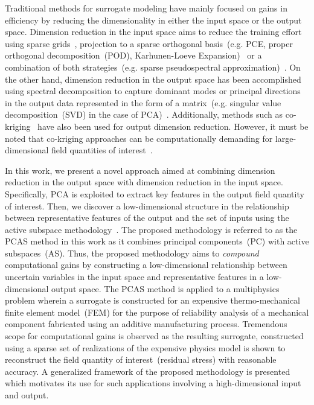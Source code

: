 Traditional methods for surrogate modeling have mainly focused on gains in efficiency by reducing the
dimensionality in either the input space or the output space. Dimension reduction in the input space
aims to reduce the training effort using sparse grids~\cite{Petvipusit:2014,Elsheikh:2014,Zhang:2013,Ma:2009},
projection to a sparse orthogonal basis~(e.g. PCE, proper orthogonal decomposition~(POD),
Karhunen-Loeve Expansion)~\cite{Wang:2005,Galbally:2010,Marzouk:2009} or a combination of both 
strategies~(e.g. sparse pseudospectral approximation)~\cite{Constantine:2012,Winokur:2013,Conrad:2013,Vohra:2017}.
On the other hand, dimension reduction in the output space has been accomplished using spectral decomposition 
to capture dominant modes or principal directions in the output data represented in the form of a 
matrix~(e.g. singular value decomposition~(SVD) in the case of PCA)~\cite{Hombal:2013,Nath:2017,Borgman:1976,Davis:1983}.
Additionally, methods such as co-kriging~\cite{Myers:1982} have also been used for output dimension reduction.  
However, it must be noted
that co-kriging approaches can be computationally demanding for large-dimensional field quantities of interest~\cite{Gogu:2013}. 

In this work, we present a novel approach aimed at combining dimension reduction in the output space with
dimension reduction in the input space. Specifically, PCA is exploited to extract key features in the
output field quantity of interest. Then, we discover a 
low-dimensional structure in the relationship between representative features of the output and the set of inputs using
the active
subspace methodology~\cite{Constantine:2015}. The proposed methodology is
referred to as the PCAS method in this work as it combines principal components~(PC) with active subspaces~(AS).
Thus, the proposed methodology aims to \textit{compound} computational gains by constructing a low-dimensional
relationship between uncertain variables in the input space and representative features in a low-dimensional
output space. The PCAS method is applied to a multiphysics problem wherein a
surrogate is constructed for an expensive thermo-mechanical finite element model~(FEM) for the purpose of reliability
analysis of a mechanical component fabricated using an additive manufacturing process. Tremendous scope
for computational gains is observed as the resulting surrogate, constructed using a sparse set of realizations
of the expensive physics model is shown to reconstruct the field quantity of interest~(residual stress)
with reasonable accuracy. A generalized framework of the proposed methodology is presented which motivates
its use for such applications involving a high-dimensional input and output.     

